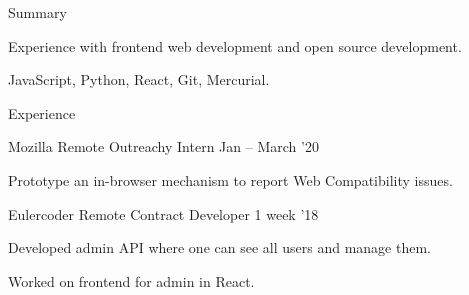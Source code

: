 \documentclass{resume} %
\begin{document}

\begin{rSection}{Summary}
  \begin{rSummarySection}
  {
    \item Experience with frontend web development and open source development.
    \item JavaScript, Python, React, Git, Mercurial.
  }
  \end{rSummarySection}
\end{rSection}


\begin{rSection}{Experience}
  \begin{rWorkSection}{Mozilla}
                      {Remote}
                      {Outreachy Intern}
                      {Jan -- March '20}
  {
    \item  Prototype an in-browser mechanism to report Web Compatibility issues.
  }
  \end{rWorkSection}

  \begin{rWorkSection}{Eulercoder}
                     {Remote}
                     {Contract Developer}
                     {1 week '18}
  {
    \item Developed admin API where one can see all users and manage them.
    \item Worked on frontend for admin in React.
  }
  \end{rWorkSection}
\end{rSection}

\end{document}
